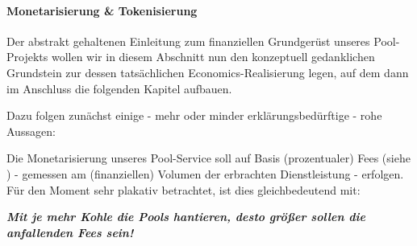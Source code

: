 
\paragraph{Monetarisierung \& Tokenisierung}
\textbf{ }
\vspace{0.3cm}

Der abstrakt gehaltenen Einleitung zum finanziellen Grundgerüst unseres Pool-Projekts wollen wir in diesem Abschnitt nun den konzeptuell gedanklichen Grundstein zur dessen tatsächlichen Economics-Realisierung legen, auf dem dann im Anschluss die folgenden Kapitel aufbauen.

\vspace{0.2cm}

Dazu folgen zunächst einige - mehr oder minder erklärungsbedürftige - rohe Aussagen: 

\vspace{0.2cm} 

\begin{Praemisse}[Monetarisierung]
\label{monetarisierung}
\vspace{0.2cm}

Die Monetarisierung unseres Pool-Service soll auf Basis (prozentualer) Fees (siehe ) - gemessen am (finanziellen) Volumen der erbrachten Dienst\-leistung - erfolgen. Für den Moment sehr plakativ betrachtet, ist dies gleichbedeutend mit: 

\vspace{0.2cm} 

\textbf{\textit{Mit je mehr Kohle die Pools hantieren, desto größer sollen die anfallenden Fees sein!}}

\end{Praemisse}

\vspace{0.5cm}

